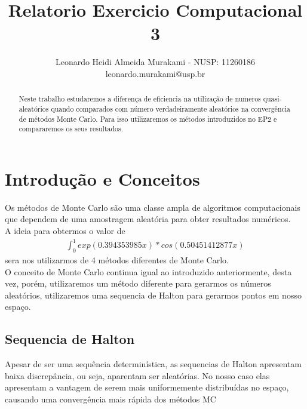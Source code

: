 \documentclass[twocolumn,amsmath,amssymb,floatfix]{revtex4}
\begin{document}

\title{Relatorio Exercicio Computacional 3}

\author{Leonardo Heidi Almeida Murakami - NUSP: 11260186 \\\small leonardo.murakami@usp.br} 

\begin{abstract}
\baselineskip 11pt
Neste trabalho estudaremos a diferença de eficiencia na utilização de numeros quasi-aleatórios quando comparados com número verdadeiramente aleatórios na convergência de métodos Monte Carlo. Para isso utilizaremos os métodos introduzidos no EP2 e compararemos os seus resultados.
\end{abstract}

\maketitle
\section{Introdução e Conceitos}

\indent Os métodos de Monte Carlo são uma classe ampla de algoritmos computacionais que dependem de uma amostragem aleatória para obter resultados numéricos. 
\\\indent A ideia para obtermos o valor de 
\begin{eqnarray}
  \int^1_0 exp(0.394353985x)*cos(0.50451412877x)
\end{eqnarray}
sera nos utilizarmos de 4 métodos diferentes de Monte Carlo. \\
\indent O conceito de Monte Carlo continua igual ao introduzido anteriormente, desta vez, porém, utilizaremos um método diferente para gerarmos os números aleatórios, utilizaremos uma sequencia de Halton para gerarmos pontos em nosso espaço.
\subsection{Sequencia de Halton}
\indent Apesar de ser uma sequência determinística, as sequencias de Halton apresentam baixa discrepância, ou seja, aparentam ser aleatórias. No nosso caso elas apresentam a vantagem de serem mais uniformemente distribuídas no espaço, causando uma convergência mais rápida dos métodos MC
\end{document}
